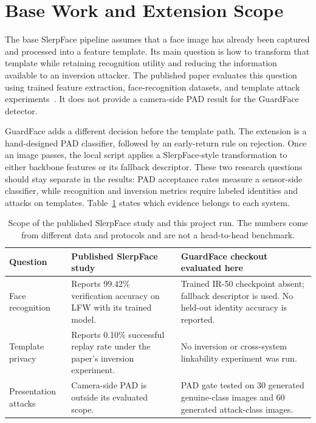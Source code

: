 \documentclass[conference,10pt]{IEEEtran}
\begin{document}
\section{Base Work and Extension Scope}
The base SlerpFace pipeline assumes that a face image has already been captured and processed into a feature template. Its main question is how to transform that template while retaining recognition utility and reducing the information available to an inversion attacker. The published paper evaluates this question using trained feature extraction, face-recognition datasets, and template attack experiments~\cite{slerpface}. It does not provide a camera-side PAD result for the GuardFace detector.

GuardFace adds a different decision before the template path. The extension is a hand-designed PAD classifier, followed by an early-return rule on rejection. Once an image passes, the local script applies a SlerpFace-style transformation to either backbone features or its fallback descriptor. These two research questions should stay separate in the results: PAD acceptance rates measure a sensor-side classifier, while recognition and inversion metrics require labeled identities and attacks on templates. Table~\ref{tab:scope} states which evidence belongs to each system.

\begin{table}[t]
\caption{Scope of the published SlerpFace study and this project run. The numbers come from different data and protocols and are not a head-to-head benchmark.}
\label{tab:scope}
\centering\footnotesize
\begin{tabular}{@{}p{}p{}p{}@{}}
\toprule
Question & Published SlerpFace study~\cite{slerpface} & GuardFace checkout evaluated here\\
\midrule
Face recognition & Reports 99.42\% verification accuracy on LFW with its trained model. & Trained IR-50 checkpoint absent; fallback descriptor is used. No held-out identity accuracy is reported.\\
Template privacy & Reports 0.10\% successful replay rate under the paper's inversion experiment. & No inversion or cross-system linkability experiment was run.\\
Presentation attacks & Camera-side PAD is outside its evaluated scope. & PAD gate tested on 30 generated genuine-class images and 60 generated attack-class images.\\
\bottomrule
\end{tabular}
\end{table}
\end{document}

